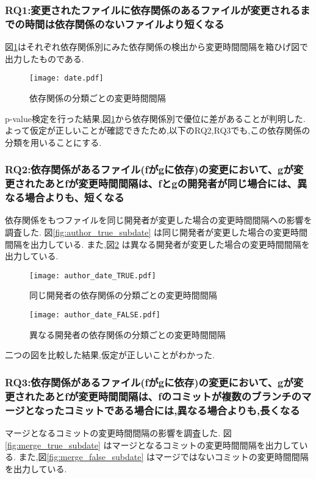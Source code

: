 \documentclass{fose2016}           %
\begin{document}
\subsubsection{RQ1:変更されたファイルに依存関係のあるファイルが変更されるまでの時間は依存関係のないファイルより短くなる}
図\ref{fig:subdate}はそれぞれ依存関係別にみた依存関係の検出から変更時間間隔を箱ひげ図で出力したものである.　　

\begin{figure}
\centering
\texttt{[image: date.pdf]}
\caption{依存関係の分類ごとの変更時間間隔}
\label{fig:subdate} 
\end{figure}



p-value検定を行った結果,図\ref{fig:subdate}から依存関係別で優位に差があることが判明した.
よって仮定が正しいことが確認できたため,以下のRQ2,RQ3でも,この依存関係の分類を用いることにする.


\subsubsection{RQ2:依存関係があるファイル(fがgに依存)の変更において、gが変更されたあとfが変更時間間隔は、fとgの開発者が同じ場合には、異なる場合よりも、短くなる}
依存関係をもつファイルを同じ開発者が変更した場合の変更時間間隔への影響を調査した.
図\ref{fig:author_true_subdate} は同じ開発者が変更した場合の変更時間間隔を出力している.
また,図\ref{fig:author_false_subdate} は異なる開発者が変更した場合の変更時間間隔を出力している.

\begin{figure}
\centering
\begin{minipage}{0.49\columnwidth}
\centering
\texttt{[image: author\_date\_TRUE.pdf]}
\caption{同じ開発者の依存関係の分類ごとの変更時間間隔}
\label{fig:author_true_subdate} 
\end{minipage}
\begin{minipage}{0.49\columnwidth}
\centering
\texttt{[image: author\_date\_FALSE.pdf]}
\caption{異なる開発者の依存関係の分類ごとの変更時間間隔}
\label{fig:author_false_subdate} 
\end{minipage}
\end{figure}
二つの図を比較した結果,仮定が正しいことがわかった.

\subsubsection{RQ3:依存関係があるファイル(fがgに依存)の変更において、gが変更されたあとfが変更時間間隔は、fのコミットが複数のブランチのマージとなったコミットである場合には,異なる場合よりも,長くなる}
マージとなるコミットの変更時間間隔の影響を調査した.
図\ref{fig:merge_true_subdate} はマージとなるコミットの変更時間間隔を出力している.
また,図\ref{fig:merge_false_subdate} はマージではないコミットの変更時間間隔を出力している.
\end{document}
